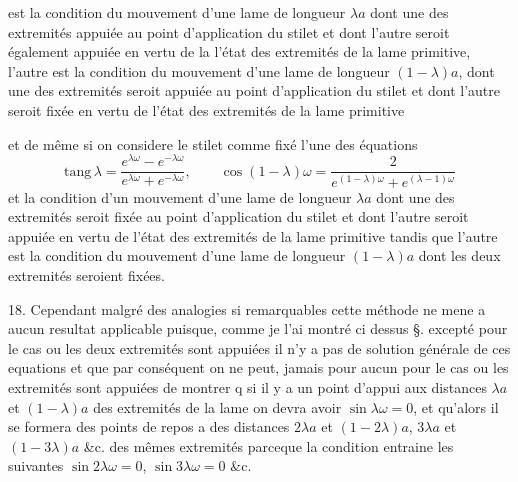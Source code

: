 \documentclass[11pt,a4paper]{article}
\begin{document}
 est la condition du mouvement d'une lame de
longueur $\lambda a$ dont  une des extremités 
appuiée au point d'application du stilet et dont l'autre seroit également
appuiée en vertu de la  l'état des extremités de la lame
primitive, l'autre est la condition du mouvement d'une lame de longueur
$(1-\lambda)a$, dont une des extremités seroit appuiée au point d'application
du stilet et dont l'autre seroit fixée en vertu de l'état des extremités de
la lame primitive

et de même si on considere le stilet comme fixé l'une des équations
\[ \text{tang}\,\lambda=\frac{e^{\lambda\omega}-e^{-\lambda\omega}}{e^{\lambda\omega}+e^{-\lambda\omega}},\qquad
\cos(1-\lambda)\omega=\frac{2}{e^{(1-\lambda)\omega}+e^{(\lambda-1)\omega}} \]
et la condition d'un mouvement d'une lame de longueur $\lambda a$ dont une
des extremités seroit fixée au point d'application du stilet et dont l'autre
seroit appuiée en vertu de l'état des extremités de la lame primitive tandis
que l'autre est la condition du mouvement d'une lame de longueur
$(1-\lambda)a$ dont les deux extremités seroient fixées.


18. Cependant malgré des analogies si remarquables cette méthode ne mene a
aucun resultat applicable puisque, comme je l'ai montré ci dessus §.
 excepté pour le cas ou les deux extremités sont appuiées il
n'y a pas de solution générale de ces equations et que par conséquent on ne
peut, jamais pour aucun pour le cas ou les extremités sont appuiées de
montrer q\ill{} si il y a un point d'appui aux distances $\lambda a$ et
$(1-\lambda)a$ des extremités de la lame on devra avoir $\sin\lambda\omega=0$,
et qu'alors il se formera des points de repos a des distances $2\lambda a$ et
$(1-2\lambda)a$, $3\lambda a$ et $(1-3\lambda)a$ \&c. des mêmes extremités
parceque la condition  entraine les
suivantes $\sin 2\lambda\omega=0$, $\sin 3\lambda\omega=0$ \&c.
\end{document}
